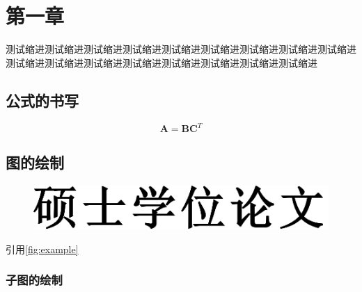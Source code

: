 \chapter{第一章}

测试缩进测试缩进测试缩进测试缩进测试缩进测试缩进测试缩进测试缩进测试缩进测试缩进测试缩进测试缩进测试缩进测试缩进测试缩进测试缩进测试缩进

\section{公式的书写}

\begin{equation}
\label{eq-1}
    \mathbf{A} = \mathbf{B} \mathbf{C}^T
\end{equation}

\section{图的绘制}

\begin{figure}
    \vspace{1em}
    \centering
    \includegraphics[width=0.7\linewidth]{figures/master-hwzs.pdf}
    \label{fig:example}
\end{figure}

引用\autoref{fig:example}

\subsection{子图的绘制}

\begin{figure}
    \centering
    \hspace{1cm}
    \label{fig:sub}
\end{figure}

